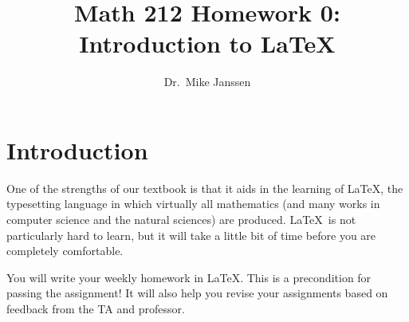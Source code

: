 \documentclass[11pt]{amsart}
\title{Math 212 Homework 0: Introduction to \LaTeX}
\author{Dr.~Mike Janssen}
\date{}                                           %
\theoremstyle{plain}
\theoremstyle{definition}
\begin{document}
\maketitle


\section{Introduction}

One of the strengths of our textbook is that it aids in the learning of \LaTeX, the typesetting language in which virtually all mathematics (and many works in computer science and the natural sciences) are produced. \LaTeX\ is not particularly hard to learn, but it will take a little bit of time before you are completely comfortable.

You will write your weekly homework in \LaTeX. This is a precondition for passing the assignment! It will also help you revise your assignments based on feedback from the TA and professor.
\end{document}
